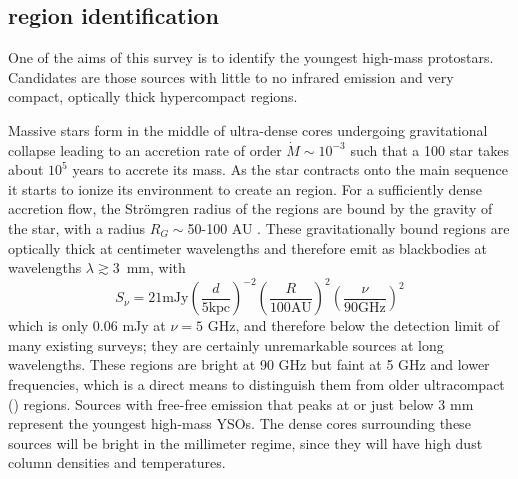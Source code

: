 \documentclass[twocolumn]{aastex62}
\begin{document}


\subsection{\hchii region identification}
One of the aims of this survey is to identify the youngest high-mass
protostars.  Candidates are those sources with little to no infrared emission
and very compact, optically thick hypercompact \hii regions.

Massive stars form in the middle of ultra-dense cores undergoing gravitational
collapse leading to an accretion rate of order $\dot{M} \sim 10^{-3}$ \msun
\peryr such that a 100 \msun star takes about $10^5$ years to accrete its mass.
As the star contracts onto the main sequence it starts to ionize its
environment to create an \hchii region.  For a sufficiently dense accretion
flow, the Strömgren radius of the \hchii regions are bound by the gravity of
the star, with a radius $R_G \sim$50-100 AU
\citep{Keto2002a,Keto2003a,Keto2007a}.  These gravitationally bound \hchii
regions are optically thick at centimeter wavelengths and therefore emit as
blackbodies at wavelengths $\lambda\gtrsim$3~mm, with 
\begin{equation}
    S_\nu=21 \textrm{mJy} \left(\frac{d}{5
    \textrm{kpc}}\right)^{-2} \left(\frac{R}{100 \textrm{AU}}\right)^2 \left(\frac{\nu}{90 \textrm{GHz}}\right)^2
\end{equation}
which is only
0.06 mJy at $\nu=5$ GHz, and therefore below the detection limit of many
existing surveys; they are certainly unremarkable sources at long wavelengths.
These \hchii regions are bright at 90 GHz but faint at 5 GHz and lower
frequencies, which is a direct means to distinguish them from older
ultracompact (\uchii) regions.  Sources
with free-free emission that peaks at or just below 3 mm represent the youngest
high-mass YSOs.  The dense cores surrounding these sources will be bright
in the millimeter regime, since they will have high dust column densities and
temperatures.
\end{document}
